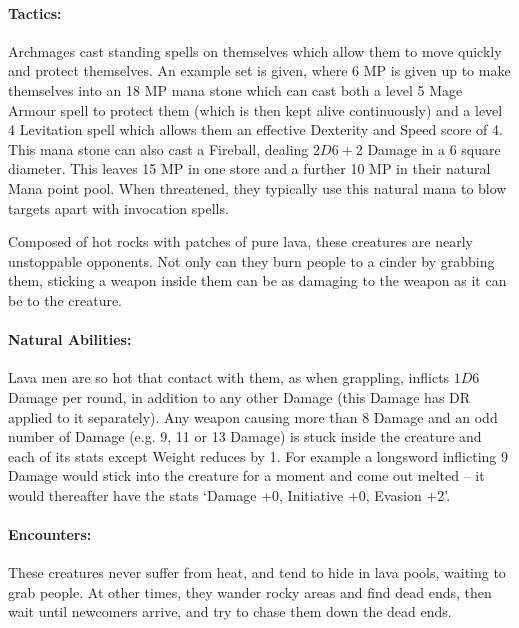 \begin{multicols}{2}
\paragraph{Tactics:} Archmages cast standing spells on themselves which allow them to move quickly and protect themselves.
An example set is given, where 6 MP is given up to make themselves into an 18 MP mana stone which can cast both a level 5 Mage Armour spell to protect them (which is then kept alive continuously) and a level 4 Levitation spell which allows them an effective Dexterity and Speed score of 4.
This mana stone can also cast a Fireball, dealing $2D6+2$ Damage in a 6 square diameter.
This leaves 15 MP in one store and a further 10 MP in their natural Mana point pool.
When threatened, they typically use this natural mana to blow targets apart with invocation spells.

\label{lavaman}

Composed of hot rocks with patches of pure lava, these creatures are nearly unstoppable opponents.  Not only can they burn people to a cinder by grabbing them, sticking a weapon inside them can be as damaging to the weapon as it can be to the creature.

\paragraph{Natural Abilities:} Lava men are so hot that contact with them, as when grappling, inflicts $1D6$ Damage per round, in addition to any other Damage (this Damage has DR applied to it separately).
Any weapon causing more than 8 Damage and an odd number of Damage (e.g. 9, 11 or 13 Damage) is stuck inside the creature and each of its stats except Weight reduces by 1.
For example a longsword inflicting 9 Damage would stick into the creature for a moment and come out melted -- it would thereafter have the stats `Damage +0, Initiative +0, Evasion +2'.

\paragraph{Encounters:} These creatures never suffer from heat, and tend to hide in lava pools, waiting to grab people.
At other times, they wander rocky areas and find dead ends, then wait until newcomers arrive, and try to chase them down the dead ends.

\lavaman

\end{multicols}

